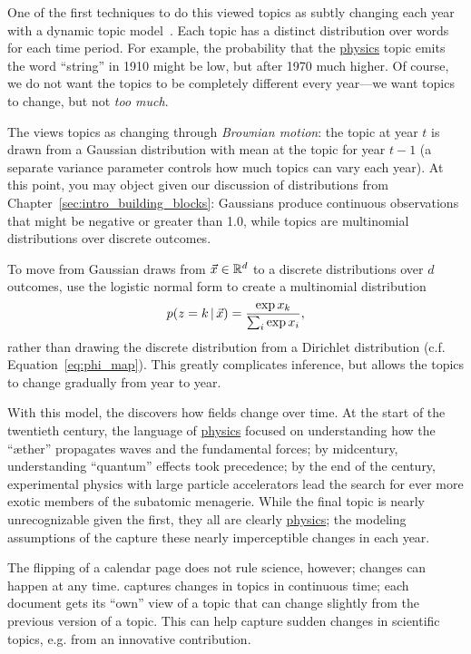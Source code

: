 One of the first techniques to do this viewed topics as subtly
changing each year with a dynamic topic
model~\citep[]{blei-06b}.  Each topic has a distinct
distribution over words for each time period.  For example, the probability that
the \underline{physics} topic emits the word ``string'' in 1910 might be low,
but after 1970 much higher.  Of course, we do not want the topics to be completely
different every year---we want topics to change, but not \emph{too
  much}.

The  views topics as changing through \emph{Brownian
  motion}: the topic at year $t$ is drawn from a Gaussian distribution
with mean at the topic for year $t-1$ (a separate variance parameter
controls how much topics can vary each year).  At this point, you may
object given our discussion of distributions from
Chapter~\ref{sec:intro_building_blocks}: Gaussians produce continuous
observations that might be negative or greater than 1.0, while topics are multinomial distributions over discrete outcomes.

To move from Gaussian draws from $\vec x \in \mathbb{R}^d$ to a discrete distributions
over $d$ outcomes, \citet{blei-06b} use the logistic normal form to
create a multinomial distribution
\begin{equation}
p(z=k \, | \, \vec x)  = \frac{\exp{x_k}}{\sum_i \exp{x_i}},
\end{equation}
rather than drawing the discrete distribution from a Dirichlet distribution
(c.f. Equation~\ref{eq:phi_map}).
This greatly complicates inference, but allows the topics to change
gradually from year to year.

With this model, the  discovers how fields change over
time.  At the start of the twentieth century, the language of
\underline{physics} focused on understanding how the ``\ae ther''
propagates waves and the fundamental forces; by midcentury,
understanding ``quantum'' effects took precedence; by the end of the
century, experimental physics with large particle accelerators lead
the search for ever more exotic members of the subatomic menagerie.
While the final topic is nearly unrecognizable given the first, they
all are clearly \underline{physics}; the modeling assumptions of the
 capture these nearly imperceptible changes in each year.

The flipping of a calendar page does not rule science, however;
changes can happen at any time.  \citet{wang-08} captures changes in
topics in continuous time; each document gets its ``own'' view of a
topic that can change slightly from the previous version of a topic.
This can help capture sudden changes in scientific topics, e.g. from
an innovative contribution.

